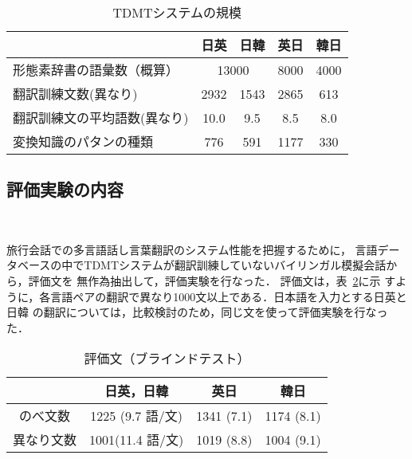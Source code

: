 \begin{table}[bht]
\begin{center}
 \caption{TDMTシステムの規模}
 \label{size}
\begin{small}
\begin{tabular}{|l||c|c|c|c|} \hline
& 日英  & 日韓 & 英日 & 韓日 \\   \hline
形態素辞書の語彙数（概算）& \multicolumn{2}{c|}{13000} &
8000 & 4000 \\ \hline
翻訳訓練文数{\footnotesize (異なり)} & 2932 & 1543 & 2865 & 613\\ \hline
翻訳訓練文の平均語数{\footnotesize (異なり)} & 10.0 & 9.5 & 8.5 & 8.0
\\ \hline
変換知識のパタンの種類& 776 & 591 & 1177 & 330\\ \hline
\end{tabular}
\end{small}
\end{center}
\end{table}

\subsection{評価実験の内容}~\label{test-cond}

旅行会話での多言語話し言葉翻訳のシステム性能を把握するために，
言語データベースの中でTDMTシステムが翻訳訓練していないバイリンガル模擬会話から，評価文を
無作為抽出して，評価実験を行なった．
評価文は，表~\ref{open-sen}に示
すように，各言語ペアの翻訳で異なり1000文以上である．日本語を入力とする日英と日韓
の翻訳については，比較検討のため，同じ文を使って評価実験を行なった．

\begin{table}
\begin{center}
 \caption{評価文（ブラインドテスト）}
 \label{open-sen}
\begin{small}
\begin{tabular}{|c||c|c|c|} \hline
& 日英，日韓 & 英日 & 韓日 \\   \hline
のべ文数 & 1225 {\footnotesize (9.7 語$/$文)} &
1341 {\footnotesize (7.1)}& 1174 {\footnotesize (8.1)}\\
異なり文数 & 1001{\footnotesize (11.4 語$/$文})
& 1019 {\footnotesize (8.8)}& 1004 {\footnotesize (9.1)}\\
\hline
\end{tabular}
\end{small}
\end{center}
\end{table}

